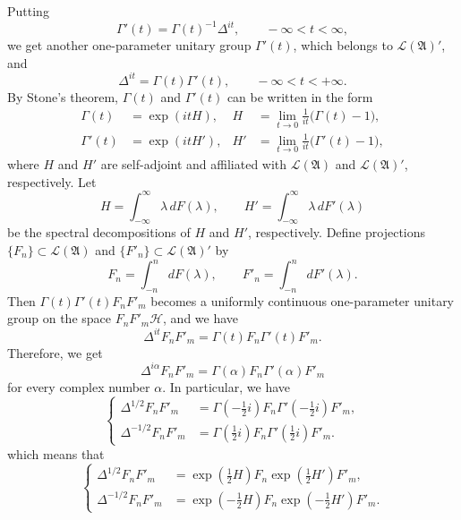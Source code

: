 \documentclass[12pt,b5paper,twoside]{article}
\theoremstyle{takesaki}
\numberwithin{equation}{section}
\begin{document}
Putting
\[
  \Gamma'(t)=\Gamma(t)^{-1}\Delta^{it},
  \qquad -\infty<t<\infty,
\]
we get another one-parameter unitary group $\Gamma'(t)$, which belongs
to $\mathcal L(\mathfrak A)'$, and
\begin{equation}
  \Delta^{it}=\Gamma(t)\Gamma'(t),
  \qquad -\infty<t<+\infty.
  \tag{14.2}\label{eq:14.2}
\end{equation}
By Stone's theorem, $\Gamma(t)$ and $\Gamma'(t)$ can be written in the
form
\begin{equation}
\begin{aligned}
  \Gamma(t)&=\exp(itH),
  &H&=\lim_{t\to0}\frac{1}{it}\bigl(\Gamma(t)-1\bigr),\\
  \Gamma'(t)&=\exp(itH'),
  &H'&=\lim_{t\to0}\frac{1}{it}\bigl(\Gamma'(t)-1\bigr),
\end{aligned}
\tag{14.3}\label{eq:14.3}
\end{equation}
where $H$ and $H'$ are self-adjoint and affiliated with
$\mathcal L(\mathfrak A)$ and $\mathcal L(\mathfrak A)'$, respectively.
Let
\begin{equation}
  H=\int_{-\infty}^{\infty}\lambda\,dF(\lambda),
  \qquad
  H'=\int_{-\infty}^{\infty}\lambda\,dF'(\lambda)
  \tag{14.4}\label{eq:14.4}
\end{equation}
be the spectral decompositions of $H$ and $H'$, respectively.  Define
projections $\{F_n\}\subset\mathcal L(\mathfrak A)$ and
$\{F'_n\}\subset\mathcal L(\mathfrak A)'$ by
\[
  F_n=\int_{-n}^{n}dF(\lambda),
  \qquad
  F'_n=\int_{-n}^{n}dF'(\lambda).
\]
Then $\Gamma(t)\Gamma'(t)F_nF'_m$ becomes a uniformly continuous
one-parameter unitary group on the space $F_nF'_m\mathcal H$, and we
have
\[
  \Delta^{it}F_nF'_m=\Gamma(t)F_n\Gamma'(t)F'_m.
\]
Therefore, we get
\begin{equation}
  \Delta^{i\alpha}F_nF'_m
    =\Gamma(\alpha)F_n\Gamma'(\alpha)F'_m
  \tag{14.5}\label{eq:14.5}
\end{equation}
for every complex number $\alpha$.  In particular, we have
\begin{equation}
\left\{
\begin{aligned}
  \Delta^{1/2}F_nF'_m
    &=\Gamma\!\left(-\tfrac12 i\right)F_n
      \Gamma'\!\left(-\tfrac12 i\right)F'_m,\\
  \Delta^{-1/2}F_nF'_m
    &=\Gamma\!\left(\tfrac12 i\right)F_n
      \Gamma'\!\left(\tfrac12 i\right)F'_m.
\end{aligned}
\right.
\tag{14.5$'$}\label{eq:14.5prime}
\end{equation}
which means that
\begin{equation}
\left\{
\begin{aligned}
  \Delta^{1/2}F_nF'_m
    &=\exp\!\left(\tfrac12H\right)F_n
      \exp\!\left(\tfrac12H'\right)F'_m,\\
  \Delta^{-1/2}F_nF'_m
    &=\exp\!\left(-\tfrac12H\right)F_n
      \exp\!\left(-\tfrac12H'\right)F'_m.
\end{aligned}
\right.
\tag{14.6}\label{eq:14.6}
\end{equation}
\end{document}
